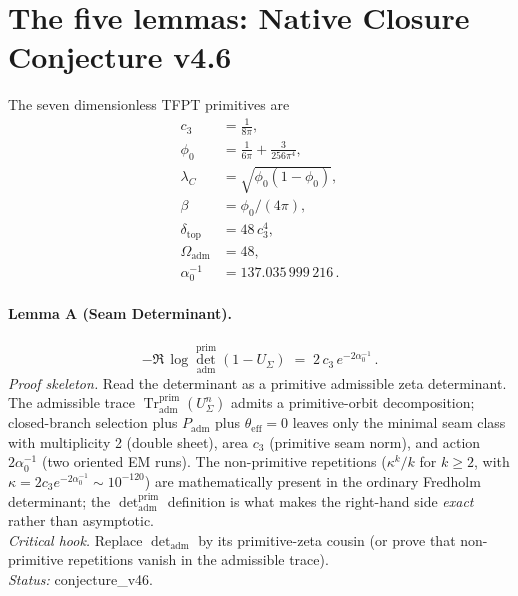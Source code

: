 \section{The five lemmas: Native Closure Conjecture v4.6}
\label{sec:lemmas}

The seven dimensionless TFPT primitives are
\begin{align}
c_3 &= \frac{1}{8\pi}, \\
\phi_0 &= \frac{1}{6\pi}+\frac{3}{256\pi^4}, \\
\lambda_C &= \sqrt{\phi_0(1-\phi_0)}, \\
\beta &= \phi_0/(4\pi), \\
\delta_{\mathrm{top}} &= 48\,c_3^4, \\
\Omega_{\mathrm{adm}} &= 48, \\
\alpha_0^{-1} &= 137.035\,999\,216 \,.
\end{align}

\paragraph{Lemma A (Seam Determinant).}
\begin{equation}
-\Re\,\log\det_{\mathrm{adm}}^{\mathrm{prim}}(1-U_\Sigma) \;=\;
2\,c_3\,e^{-2\alpha_0^{-1}} \,.
\label{eq:lemmaA}
\end{equation}
\emph{Proof skeleton.} Read the determinant as a primitive admissible
zeta determinant.  The admissible trace
\(\operatorname{Tr}_{\mathrm{adm}}^{\mathrm{prim}}(U_\Sigma^n)\) admits
a primitive-orbit decomposition; closed-branch selection plus
\(P_{\mathrm{adm}}\) plus \(\theta_{\mathrm{eff}}=0\) leaves only the
minimal seam class with multiplicity 2 (double sheet), area \(c_3\)
(primitive seam norm), and action \(2\alpha_0^{-1}\) (two oriented EM
runs).  The non-primitive repetitions (\(\kappa^k/k\) for \(k\ge 2\),
with \(\kappa=2c_3 e^{-2\alpha_0^{-1}}\sim 10^{-120}\)) are
mathematically present in the ordinary Fredholm determinant; the
\(\det_{\mathrm{adm}}^{\mathrm{prim}}\) definition is what makes the
right-hand side \emph{exact} rather than asymptotic.\\
\emph{Critical hook.} Replace
\(\det_{\mathrm{adm}}\) by its primitive-zeta cousin (or prove that
non-primitive repetitions vanish in the admissible trace).\\
\emph{Status:} \textsf{conjecture\_v46}.

